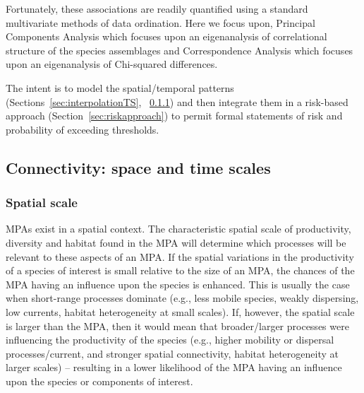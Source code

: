 \documentclass[letterpaper,portrait,11pt]{scrartcl}
\numberwithin{equation}{section}    %
\numberwithin{figure}{section}    %
\numberwithin{table}{section}       %
\begin{document}
Fortunately, these associations are readily quantified using a standard multivariate methods of data ordination. Here we focus upon, Principal Components Analysis which focuses upon an eigenanalysis of correlational structure of the species assemblages and Correspondence Analysis which focuses upon an eigenanalysis of Chi-squared differences.  

The intent is to model the spatial/temporal patterns (Sections~\ref{sec:interpolationTS}, ~\ref{sec:interpolationSpatial}) and then integrate them in a risk-based approach (Section~\ref{sec:riskapproach}) to permit formal statements of risk and probability of exceeding thresholds. 



\subsection{Connectivity: space and time scales}
\label{sec:connectivity}

\subsubsection{Spatial scale}
\label{sec:interpolationSpatial}

MPAs exist in a spatial context. The characteristic spatial scale of productivity, diversity and habitat found in the MPA will determine which processes will be relevant to these aspects of an MPA. If the spatial variations in the productivity of a species of interest is small relative to the size of an MPA, the chances of the MPA having an influence upon the species is enhanced. This is usually the case when short-range processes dominate (e.g., less mobile species, weakly dispersing, low currents, habitat heterogeneity at small scales). If, however, the spatial scale is larger than the MPA, then it would mean that broader/larger processes were influencing the productivity of the species (e.g., higher mobility or dispersal processes/current, and stronger spatial connectivity, habitat heterogeneity at larger scales) -- resulting in a lower likelihood of the MPA having an influence upon the species or components of interest. 
\end{document}
